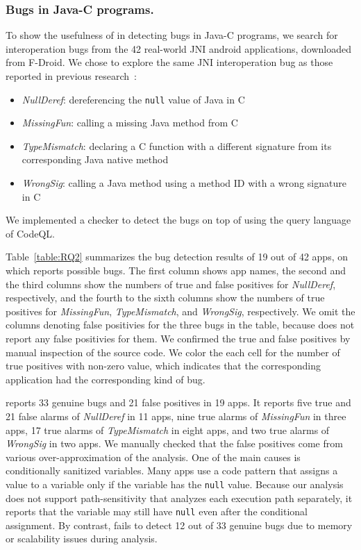\subsubsection{Bugs in Java-C programs.}
To show the usefulness of \ours in detecting bugs in Java-C programs,
we search for interoperation bugs from the 42 real-world JNI android applications, downloaded from F-Droid.
We chose to explore the same JNI interoperation bug as those
reported in previous research~\cite{LeeASE20, ILEA}:
\begin{itemize}
  \item {\it NullDeref}: dereferencing the {\tt null} value of Java in C
  \item {\it MissingFun}: calling a missing Java method from C
  \item {\it TypeMismatch}: declaring a C function with a different signature
    from its corresponding Java native method
  \item {\it WrongSig}: calling a Java method using a method ID with a
    wrong signature in C
\end{itemize}
We implemented a checker to detect the bugs on top of \ours using the
query language of CodeQL. 

Table~\ref{table:RQ2} summarizes the bug detection results of 19 out of 42
apps, on which \ours reports possible bugs.  The first
column shows app names, the second and the third columns show the
numbers of true and false positives for {\it NullDeref}, respectively, and
the fourth to the sixth columns show the numbers of true positives for {\it
MissingFun}, {\it TypeMismatch}, and {\it WrongSig}, respectively.
We omit the columns denoting false positivies for the three bugs in the table,
because \ours does not report any false positivies for them.
We confirmed the true and false positives by manual inspection of the source code.
We color the each cell for the number of true positives with non-zero value,
which indicates that the corresponding application had the corresponding kind of bug.

\ours reports 33 genuine bugs and 21 false positives in 19 apps.
It reports five true and 21 false alarms of {\it NullDeref} in 11 apps,
nine true alarms of {\it MissingFun} in three apps,
17 true alarms of {\it TypeMismatch} in eight apps, and
two true alarms of {\it WrongSig} in two apps.
We manually checked that the false positives come from various over-approximation
of the analysis. One of the main causes is conditionally sanitized variables.  Many apps
use a code pattern that assigns a value to a variable only if the variable has
the {\tt null} value. Because our analysis does not support
path-sensitivity that analyzes each execution path separately, it reports that
the variable may still have {\tt null} even after the conditional assignment.
By contrast, \lees fails to detect 12 out of 33 genuine bugs
due to memory or scalability issues during analysis.

